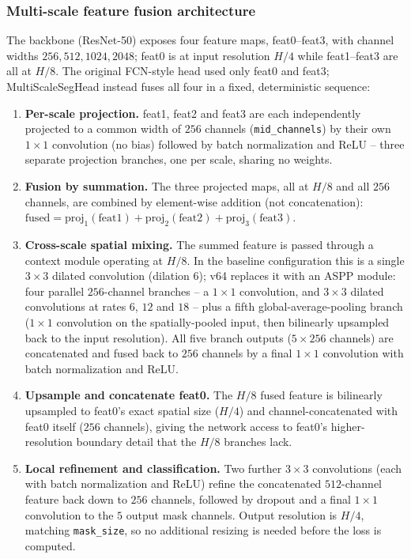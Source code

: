 \documentclass[conference]{IEEEtran}
\begin{document}
\subsubsection{Multi-scale feature fusion architecture}
\label{sec:method-fusion}

The backbone (ResNet-50) exposes four feature maps, feat0--feat3, with
channel widths $256, 512, 1024, 2048$; feat0 is at input resolution $H/4$
while feat1--feat3 are all at $H/8$. The original FCN-style head used
only feat0 and feat3; MultiScaleSegHead instead fuses all four in a
fixed, deterministic sequence:

\begin{enumerate}
\item \textbf{Per-scale projection.} feat1, feat2 and feat3 are each
independently projected to a common width of $256$ channels
(\texttt{mid\_channels}) by their own $1{\times}1$ convolution (no bias)
followed by batch normalization and ReLU -- three separate projection
branches, one per scale, sharing no weights.
\item \textbf{Fusion by summation.} The three projected maps, all at
$H/8$ and all $256$ channels, are combined by element-wise addition (not
concatenation): $\text{fused} = \text{proj}_1(\text{feat1}) +
\text{proj}_2(\text{feat2}) + \text{proj}_3(\text{feat3})$.
\item \textbf{Cross-scale spatial mixing.} The summed feature is passed
through a context module operating at $H/8$. In the baseline
configuration this is a single $3{\times}3$ dilated convolution
(dilation $6$); v64 replaces it with an ASPP module: four parallel
$256$-channel branches -- a $1{\times}1$ convolution, and $3{\times}3$
dilated convolutions at rates $6$, $12$ and $18$ -- plus a fifth
global-average-pooling branch ($1{\times}1$ convolution on the
spatially-pooled input, then bilinearly upsampled back to the input
resolution). All five branch outputs ($5{\times}256$ channels) are
concatenated and fused back to $256$ channels by a final $1{\times}1$
convolution with batch normalization and ReLU.
\item \textbf{Upsample and concatenate feat0.} The $H/8$ fused feature is
bilinearly upsampled to feat0's exact spatial size ($H/4$) and
channel-concatenated with feat0 itself ($256$ channels), giving the
network access to feat0's higher-resolution boundary detail that the
$H/8$ branches lack.
\item \textbf{Local refinement and classification.} Two further
$3{\times}3$ convolutions (each with batch normalization and ReLU)
refine the concatenated $512$-channel feature back down to $256$
channels, followed by dropout and a final $1{\times}1$ convolution to
the $5$ output mask channels. Output resolution is $H/4$, matching
\texttt{mask\_size}, so no additional resizing is needed before the loss
is computed.
\end{enumerate}
\end{document}
